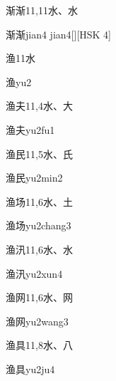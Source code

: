 \begin{entry}{渐渐}{11,11}{⽔、⽔}
  \begin{phonetics}{渐渐}{jian4 jian4}[][HSK 4]
  \end{phonetics}
\end{entry}

\begin{entry}{渔}{11}{⽔}
  \begin{phonetics}{渔}{yu2}
  \end{phonetics}
\end{entry}

\begin{entry}{渔夫}{11,4}{⽔、⼤}
  \begin{phonetics}{渔夫}{yu2fu1}
  \end{phonetics}
\end{entry}

\begin{entry}{渔民}{11,5}{⽔、⽒}
  \begin{phonetics}{渔民}{yu2min2}
  \end{phonetics}
\end{entry}

\begin{entry}{渔场}{11,6}{⽔、⼟}
  \begin{phonetics}{渔场}{yu2chang3}
  \end{phonetics}
\end{entry}

\begin{entry}{渔汛}{11,6}{⽔、⽔}
  \begin{phonetics}{渔汛}{yu2xun4}
  \end{phonetics}
\end{entry}

\begin{entry}{渔网}{11,6}{⽔、⽹}
  \begin{phonetics}{渔网}{yu2wang3}
  \end{phonetics}
\end{entry}

\begin{entry}{渔具}{11,8}{⽔、⼋}
  \begin{phonetics}{渔具}{yu2ju4}
  \end{phonetics}
\end{entry}

